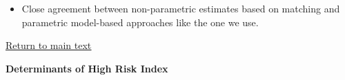 \documentclass[static]{JJH-Beamer}
\begin{document}
\begin{frame}
 \addtocounter{framenumber}{-1}

\begin{itemize}
\item Close agreement between non-parametric estimates based on matching and parametric model-based approaches like the one we use.
\end{itemize}

\end{frame}

\begin{frame}
 \addtocounter{framenumber}{-1}

\begin{center}
\hyperlink{ret:potpie}{\underline{Return to main text}}
\end{center}

\end{frame}

\begin{frame}
 \addtocounter{framenumber}{-1}

\hypertarget{chocohocochip}{}
\begin{center}
\textbf{Determinants of High Risk Index}
\end{center}

\end{frame}
\end{document}
